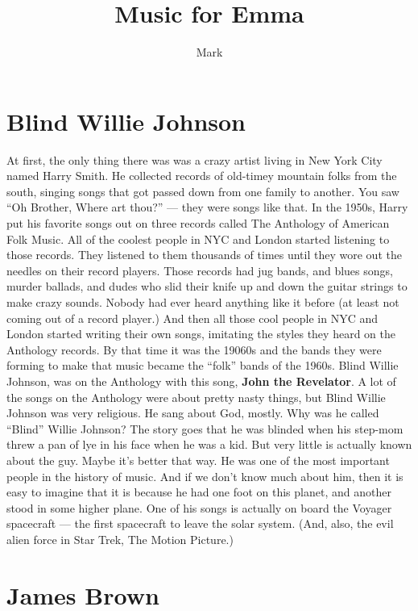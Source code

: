\documentclass[letterpaper,12pt,single]{article}
\title{Music for Emma}
\author{Mark}
\begin{document}
 
\maketitle

\section{Blind Willie Johnson}

At first, the only thing there was was a crazy artist living in New York City named Harry Smith. 
He collected records of old-timey mountain folks from the south, singing songs that got passed down from one family to another. 
You saw ``Oh Brother, Where art thou?'' --- they were songs like that. 
In the 1950s, Harry put his favorite songs out on three records called The Anthology of American Folk Music. 
All of the coolest people in NYC and London started listening to those records.
They listened to them thousands of times until they wore out the needles on their record players. 
Those records had jug bands, and blues songs, murder ballads, and dudes who slid their knife up and down the guitar strings to make crazy sounds.
Nobody had ever heard anything like it before (at least not coming out of a record player.)
And then all those cool people in NYC and London started writing their own songs, imitating the styles they heard on the Anthology records. 
By that time it was the 19060s and the bands they were forming to make that music became the ``folk'' bands of the 1960s.
Blind Willie Johnson, was on the Anthology with this song, \textbf{John the Revelator}. 
A lot of the songs on the Anthology were about pretty nasty things, but Blind Willie Johnson was very religious. He sang about God, mostly.
Why was he called ``Blind'' Willie Johnson?
The story goes that he was blinded when his step-mom threw a pan of lye in his face when he was a kid. 
But very little is actually known about the guy.
Maybe it's better that way.
He was one of the most important people in the history of music.
And if we don't know much about him, then it is easy to imagine that it is because he had one foot on this planet, and another stood in some higher plane.
One of his songs is actually on board the Voyager spacecraft --- the first spacecraft to leave the solar system. (And, also, the evil alien force in Star Trek, The Motion Picture.)

\section{James Brown}
\end{document}
